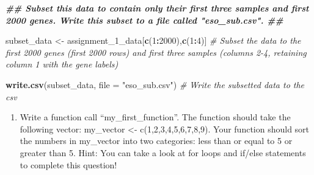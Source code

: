 \documentclass[
]{article}
\newenvironment{Shaded}{\begin{snugshade}}{\end{snugshade}}
\newcommand{\AttributeTok}[1]{\textcolor[rgb]{0.13,0.29,0.53}{#1}}
\newcommand{\CommentTok}[1]{\textcolor[rgb]{0.56,0.35,0.01}{\textit{#1}}}
\newcommand{\DecValTok}[1]{\textcolor[rgb]{0.00,0.00,0.81}{#1}}
\newcommand{\DocumentationTok}[1]{\textcolor[rgb]{0.56,0.35,0.01}{\textbf{\textit{#1}}}}
\newcommand{\FunctionTok}[1]{\textcolor[rgb]{0.13,0.29,0.53}{\textbf{#1}}}
\newcommand{\NormalTok}[1]{#1}
\newcommand{\OtherTok}[1]{\textcolor[rgb]{0.56,0.35,0.01}{#1}}
\newcommand{\SpecialCharTok}[1]{\textcolor[rgb]{0.81,0.36,0.00}{\textbf{#1}}}
\newcommand{\StringTok}[1]{\textcolor[rgb]{0.31,0.60,0.02}{#1}}
\providecommand{\tightlist}{%
  \setlength{\itemsep}{0pt}\setlength{\parskip}{0pt}}
\begin{document}
\begin{Shaded}
\begin{Highlighting}[]
\DocumentationTok{\#\# Subset this data to contain only their first three samples and first 2000 genes. Write this subset to a file called "eso\_sub.csv". \#\#}

\NormalTok{subset\_data }\OtherTok{\textless{}{-}}\NormalTok{ assignment\_1\_data[}\FunctionTok{c}\NormalTok{(}\DecValTok{1}\SpecialCharTok{:}\DecValTok{2000}\NormalTok{),}\FunctionTok{c}\NormalTok{(}\DecValTok{1}\SpecialCharTok{:}\DecValTok{4}\NormalTok{)] }\CommentTok{\# Subset the data to the first 2000 genes (first 2000 rows) and first three samples (columns 2{-}4, retaining column 1 with the gene labels)}

\FunctionTok{write.csv}\NormalTok{(subset\_data, }\AttributeTok{file =} \StringTok{"eso\_sub.csv"}\NormalTok{) }\CommentTok{\# Write the subsetted data to the csv }
\end{Highlighting}
\end{Shaded}

\begin{enumerate}
\def\labelenumi{\arabic{enumi})}
\setcounter{enumi}{2}
\tightlist
\item
  Write a function call ``my\_first\_function''. The function should
  take the following vector: my\_vector \textless- c(1,2,3,4,5,6,7,8,9).
  Your function should sort the numbers in my\_vector into two
  categories: less than or equal to 5 or greater than 5. Hint: You can
  take a look at for loops and if/else statements to complete this
  question!
\end{enumerate}
\end{document}
